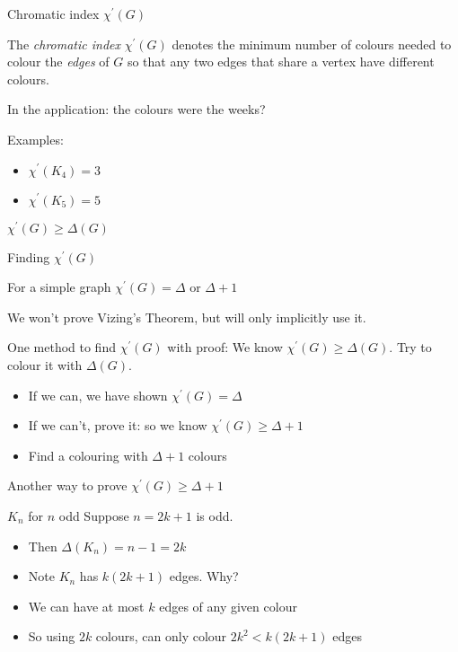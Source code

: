 \documentclass{beamer}
\begin{document}
\begin{frame}{Chromatic index $\chi^\prime(G)$}
  \begin{definition}
The \emph{chromatic index} $\chi^\prime(G)$ denotes the minimum number of colours needed to colour the \emph{edges} of $G$ so that any two edges that share a vertex have different colours.
    \end{definition}
In the application: the colours were the weeks?

\begin{block}{Examples:}
  \begin{itemize}
  \item $\chi^\prime(K_4)=3$
    \item $\chi^\prime(K_5)=5$
  \end{itemize}
  \end{block}
\begin{lemma} $\chi^\prime(G)\geq \Delta(G)$
  \end{lemma}

\end{frame}

\begin{frame}{Finding $\chi^\prime(G)$}

  \begin{theorem}[Vizing]
For a simple graph $\chi^\prime(G)=\Delta$ or $\Delta+1$
    \end{theorem}
  We won't prove Vizing's Theorem, but will only implicitly use it.

  \begin{block}{One method to find $\chi^\prime(G)$ with proof:}
 We know $\chi^\prime(G)\geq \Delta(G)$.  Try to colour it with $\Delta(G)$.
 \begin{itemize}
 \item If we can, we have shown $\chi^\prime(G)=\Delta$
 \item If we can't, prove it: so we know $\chi^\prime(G)\geq \Delta+1$
 \item Find a colouring with $\Delta+1$ colours 
   \end{itemize}


   \end{block}
  \end{frame}

\begin{frame}{Another way to prove $\chi^\prime(G)\geq \Delta+1$}



  \begin{example}{$K_n$ for $n$ odd}
    Suppose $n=2k+1$ is odd.
\begin{itemize}
\item Then $\Delta(K_n)=n-1=2k$  
\item Note $K_n$ has $k(2k+1)$ edges.  Why? 
\item We can have at most $k$ edges of any given colour
\item So using $2k$ colours, can only colour $2k^2<k(2k+1)$ edges
\end{itemize}
  


    

\end{example}
\end{frame}
\end{document}
